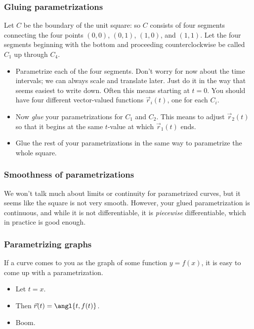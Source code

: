 \documentclass[11pt,ignorenonframetext,aspectratio=169,xcolor={svgnames}]{beamer}
\begin{document}
\begin{frame}\frametitle{Gluing parametrizations}

Let $C$ be the boundary of the unit square: so $C$ consists of four
segments connecting the four points $(0,0)$, $(0,1)$, $(1,0)$, and
$(1,1)$. Let the four segments beginning with the bottom and proceeding
counterclockwise be called $C_1$ up through $C_4$.

\begin{itemize}[<+->]
\itemsep1pt\parskip0pt
\item
  Parametrize each of the four segments. Don't worry for now about the
  time intervals; we can always scale and translate later. Just do it in
  the way that seems easiest to write down. Often this means starting at
  $t = 0$. You should have four different vector-valued functions
  $\vec{r}_i(t)$, one for each $C_i$.
\item
  Now \emph{glue} your parametrizations for $C_1$ and $C_2$. This means
  to adjust $\vec{r}_2(t)$ so that it begins at the same $t$-value at
  which $\vec{r}_1(t)$ ends.
\item
  Glue the rest of your parametrizations in the same way to parametrize
  the whole square.
\end{itemize}

\end{frame}

\begin{frame}\frametitle{Smoothness of parametrizations}

We won't talk much about limits or continuity for parametrized curves,
but it seems like the square is not very smooth. However, your glued
parametrization is continuous, and while it is not differentiable, it is
\emph{piecewise} differentiable, which in practice is good enough.

\end{frame}

\begin{frame}\frametitle{Parametrizing graphs}

If a curve comes to you as the graph of some function $y = f(x)$, it is
easy to come up with a parametrization.

\begin{itemize}[<+->]
\itemsep1pt\parskip0pt
\item
  Let $t = x$.
\item
  Then $\vec{r}(t) = \angl{t, f(t)}$.
\item
  Boom.
\end{itemize}

\end{frame}
\end{document}
